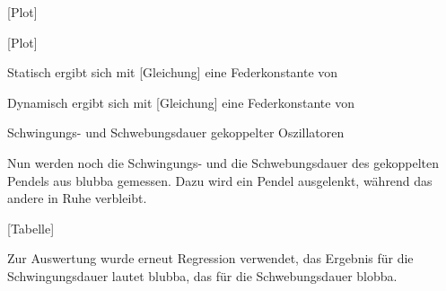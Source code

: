 [Plot]

[Plot]

Statisch ergibt sich mit [Gleichung] eine Federkonstante von

Dynamisch ergibt sich mit [Gleichung] eine Federkonstante von

Schwingungs- und Schwebungsdauer gekoppelter Oszillatoren

Nun werden noch die Schwingungs- und die Schwebungsdauer des gekoppelten Pendels aus blubba gemessen.
Dazu wird ein Pendel ausgelenkt, während das andere in Ruhe verbleibt.

[Tabelle]

Zur Auswertung wurde erneut Regression verwendet, das Ergebnis für die Schwingungsdauer lautet blubba, das für die Schwebungsdauer blobba.